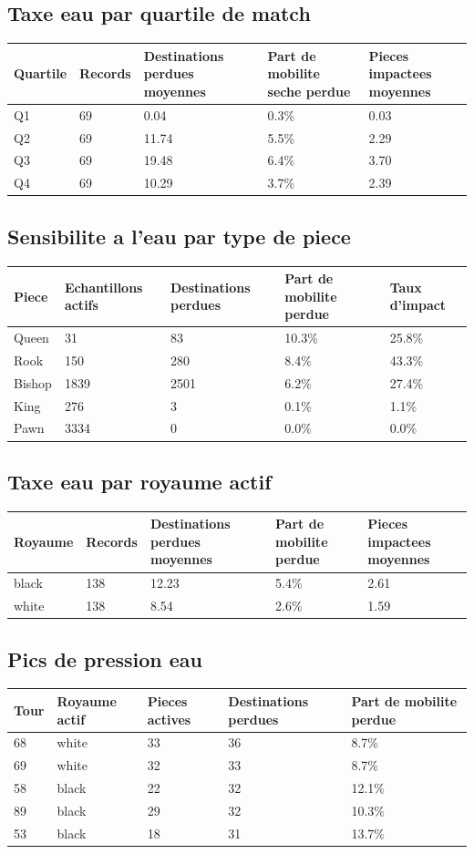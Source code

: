 \documentclass[11pt,a4paper]{article}
\begin{document}
\subsection*{Taxe eau par quartile de match}
\begin{tabularx}{\linewidth}{X|X|X|X|X}
\toprule
Quartile & Records & Destinations perdues moyennes & Part de mobilite seche perdue & Pieces impactees moyennes \\
\midrule
Q1 & 69 & 0.04 & 0.3\% & 0.03 \\
Q2 & 69 & 11.74 & 5.5\% & 2.29 \\
Q3 & 69 & 19.48 & 6.4\% & 3.70 \\
Q4 & 69 & 10.29 & 3.7\% & 2.39 \\
\bottomrule
\end{tabularx}
\subsection*{Sensibilite a l'eau par type de piece}
\begin{tabularx}{\linewidth}{X|X|X|X|X}
\toprule
Piece & Echantillons actifs & Destinations perdues & Part de mobilite perdue & Taux d'impact \\
\midrule
Queen & 31 & 83 & 10.3\% & 25.8\% \\
Rook & 150 & 280 & 8.4\% & 43.3\% \\
Bishop & 1839 & 2501 & 6.2\% & 27.4\% \\
King & 276 & 3 & 0.1\% & 1.1\% \\
Pawn & 3334 & 0 & 0.0\% & 0.0\% \\
\bottomrule
\end{tabularx}
\subsection*{Taxe eau par royaume actif}
\begin{tabularx}{\linewidth}{X|X|X|X|X}
\toprule
Royaume & Records & Destinations perdues moyennes & Part de mobilite perdue & Pieces impactees moyennes \\
\midrule
black & 138 & 12.23 & 5.4\% & 2.61 \\
white & 138 & 8.54 & 2.6\% & 1.59 \\
\bottomrule
\end{tabularx}
\subsection*{Pics de pression eau}
\begin{tabularx}{\linewidth}{X|X|X|X|X}
\toprule
Tour & Royaume actif & Pieces actives & Destinations perdues & Part de mobilite perdue \\
\midrule
68 & white & 33 & 36 & 8.7\% \\
69 & white & 32 & 33 & 8.7\% \\
58 & black & 22 & 32 & 12.1\% \\
89 & black & 29 & 32 & 10.3\% \\
53 & black & 18 & 31 & 13.7\% \\
\bottomrule
\end{tabularx}
\end{document}
